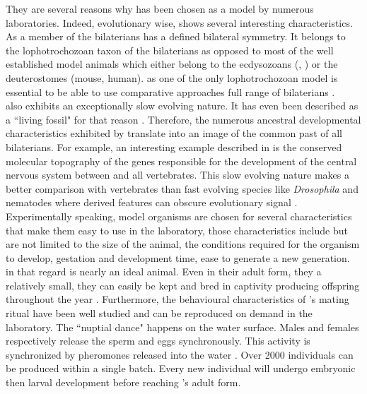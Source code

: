      They are several reasons why \platy{} has been chosen as a model by numerous laboratories. Indeed, evolutionary wise, \platy{} shows several interesting characteristics.  As a member of the bilaterians \platy{} has a defined bilateral symmetry. It belongs to the lophotrochozoan taxon of the bilaterians as opposed to most of the well established model animals which either belong to the ecdysozoans (, ) or the deuterostomes (mouse, human). \platy{} as one of the only lophotrochozoan model is essential to be able to use comparative approaches full range of bilaterians \cite{Fischer10}.\\
     
     \platy{} also exhibits an exceptionally slow evolving nature. It has even been described as a ``living fossil" for that reason \cite{Fischer10}. Therefore, the numerous ancestral developmental characteristics exhibited by \platy{} translate into an image of the common past of all bilaterians. For example, an interesting example described in \cite{denes07,tessmar07} is the conserved molecular topography of the genes responsible for the development of the central nervous system between \platy{} and all vertebrates. This slow evolving nature makes \platy{} a better comparison with vertebrates than fast evolving species like \emph{Drosophila} and nematodes where derived features can obscure evolutionary signal \cite{Fischer10,arendt124}.\\
     
     Experimentally speaking, model organisms are chosen for several characteristics that make them easy to use in the laboratory, those characteristics include but are not limited to the size of the animal, the conditions required for the organism to develop, gestation and development time, ease to generate a new generation.\\
     
     in that regard \platy{} is nearly an ideal animal. Even in their adult form, they a relatively small, they can easily be kept and bred in captivity producing offspring throughout the year \cite{fischer04}. Furthermore, the behavioural characteristics of \platy{}'s mating ritual have been well studied and can be reproduced on demand in the laboratory. The ``nuptial dance" happens on the water surface. Males and females respectively release the sperm and eggs synchronously. This activity is synchronized by pheromones released into the water \cite{zeeck98}. Over 2000 individuals can be produced within a single batch. Every new individual will undergo embryonic then larval development before reaching \platy{}'s adult form.\\

